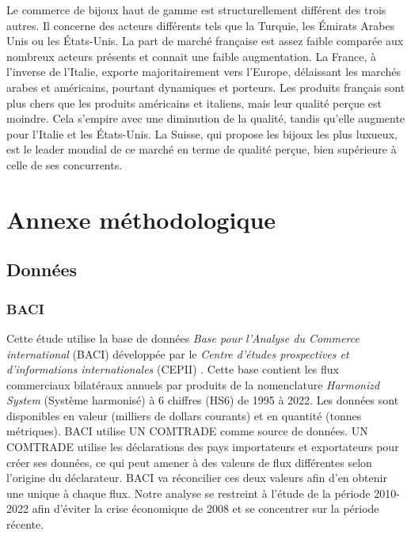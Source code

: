 \documentclass[french,10pt,a4paper]{article}
\begin{document}
Le commerce de bijoux haut de gamme est structurellement différent des trois autres. Il concerne des acteurs différents tels que la Turquie, les Émirats Arabes Unis ou les États-Unis. La part de marché française est assez faible comparée aux nombreux acteurs présents et connait une faible augmentation. La France, à l'inverse de l'Italie, exporte majoritairement vers l'Europe, délaissant les marchés arabes et américains, pourtant dynamiques et porteurs. Les produits français sont plus chers que les produits américains et italiens, mais leur qualité perçue est moindre. Cela s'empire avec une diminution de la qualité, tandis qu'elle augmente pour l'Italie et les États-Unis. La Suisse, qui propose les bijoux les plus luxueux, est le leader mondial de ce marché en terme de qualité perçue, bien supérieure à celle de ses concurrents.



\newpage

\section*{Annexe méthodologique}
\subsection*{Données}
\subsubsection*{BACI}
Cette étude utilise la base de données \textit{Base pour l'Analyse du Commerce international} (BACI) développée par le \textit{Centre d'études prospectives et d'informations internationales} (CEPII) \citep{Gaulier2010}. Cette base contient les flux commerciaux bilatéraux annuels par produits de la nomenclature \textit{Harmonizd System} (Système harmonisé) à 6 chiffres (HS6) de 1995 à 2022. Les données sont disponibles en valeur (milliers de dollars courants) et en quantité (tonnes métriques). BACI utilise UN COMTRADE comme source de données. UN COMTRADE utilise les déclarations des pays importateurs et exportateurs pour créer ses données, ce qui peut amener à des valeurs de flux différentes selon l'origine du déclarateur. BACI va réconcilier ces deux valeurs afin d'en obtenir une unique à chaque flux. Notre analyse se restreint à l'étude de la période 2010-2022 afin d'éviter la crise économique de 2008 et se concentrer sur la période récente.
\end{document}
